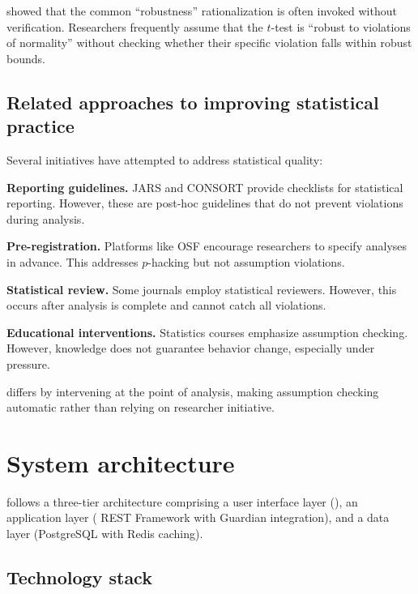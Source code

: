 \documentclass[article]{jss}
\begin{document}
\citet{zimmerman2004note} showed that the common ``robustness'' rationalization is often invoked without verification. Researchers frequently assume that the $t$-test is ``robust to violations of normality'' without checking whether their specific violation falls within robust bounds.

\subsection{Related approaches to improving statistical practice}

Several initiatives have attempted to address statistical quality:

\textbf{Reporting guidelines.} JARS \citep{appelbaum2018jars} and CONSORT \citep{schulz2010consort} provide checklists for statistical reporting. However, these are post-hoc guidelines that do not prevent violations during analysis.

\textbf{Pre-registration.} Platforms like OSF \citep{nosek2018preregistration} encourage researchers to specify analyses in advance. This addresses $p$-hacking but not assumption violations.

\textbf{Statistical review.} Some journals employ statistical reviewers. However, this occurs after analysis is complete and cannot catch all violations.

\textbf{Educational interventions.} Statistics courses emphasize assumption checking. However, knowledge does not guarantee behavior change, especially under pressure.

 differs by intervening at the point of analysis, making assumption checking automatic rather than relying on researcher initiative.


\section{System architecture} \label{sec:architecture}

 follows a three-tier architecture comprising a user interface layer (), an application layer ( REST Framework with Guardian integration), and a data layer (PostgreSQL with Redis caching).

\subsection{Technology stack}
\end{document}
